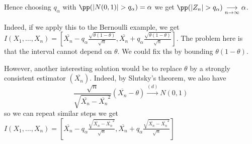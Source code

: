 \documentclass[../main.tex]{subfiles}
\begin{document}
Hence choosing
$q_{\alpha}$ with $\pp(|N(0, 1)| > q_{\alpha}) = \alpha$ we get $\pp(|Z_n| >
q_{\alpha}) \underset{n \to \infty}{\longrightarrow} \alpha$.

Indeed, if we apply this to the Bernoulli example, we get $I(X_1, \ldots, X_n) =
[\overline{X_n} - q_{\alpha} \frac{\sqrt{\theta (1 - \theta)}}{\sqrt{n}},
\overline{X_n} + q_{\alpha} \frac{\sqrt{\theta (1 - \theta)}}{\sqrt{n}}] $.
The problem here is that the interval cannot depend on $\theta$. We could fix
ths by bounding $\theta(1 - \theta)$.

However, another interesting solution would be to replace $\theta$ by a strongly
consistent estimator $(\overline{X_n})$. Indeed, by Slutsky's theorem, we also have
\[
  \frac{\sqrt{n}}{\sqrt{\overline{X_n} - \overline{X_n}^2}} (\overline{X_n} -
  \theta) \overset{(d)}{\longrightarrow} N(0, 1) 
\]
so we can repeat similar steps we get $I(X_1, \ldots, X_n) = [\overline{X_n} -
q_{\alpha}\frac{\sqrt{\overline{X_n} - \overline{X_n}^2}}{\sqrt{n}}, \overline{X_n} +
q_{\alpha}\frac{\sqrt{\overline{X_n} - \overline{X_n}^2}}{\sqrt{n}}] $
\end{document}
